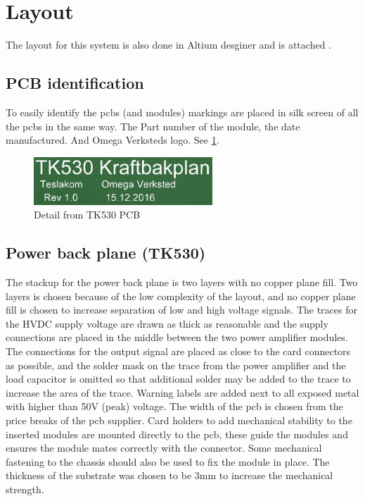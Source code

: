 \section{Layout}
The layout for this system is also done in Altium desginer and is attached .

\subsection{PCB identification}
To easily identify the pcbs (and modules) markings are placed in silk screen of all the pcbs in the same way. The Part number of the module, the date manufactured. And Omega Verksteds logo. See \cref{fig:tk530_tekst}.
\begin{figure}
    \centering
    \includegraphics[width=0.6\textwidth]{img/TK530_Tekst.PNG}
    \caption{Detail from TK530 PCB}
    \label{fig:tk530_tekst}
\end{figure}

\subsection{Power back plane (TK530)}
The stackup for the power back plane is two layers with no copper plane fill. Two layers is chosen because of the low complexity of the layout, and no copper plane fill is chosen to increase separation of low and high voltage signals. The traces for the HVDC supply voltage are drawn as thick as reasonable and the supply connections are placed in the middle between the two power amplifier modules. The connections for the output signal are placed as close to the card connectors as possible, and the solder mask on the trace from the power amplifier and the load capacitor is omitted so that additional solder may be added to the trace to increase the area of the trace. Warning labels are added next to all exposed metal with higher than 50V (peak) voltage. The width of the pcb is chosen from the price breaks of the pcb supplier. Card holders to add mechanical stability to the inserted modules are mounted directly to the pcb, these guide the modules and ensures the module mates correctly with the connector. Some mechanical fastening to the chassis should also be used to fix the module in place. The thickness of the substrate was chosen to be 3mm to increase the mechanical strength.


